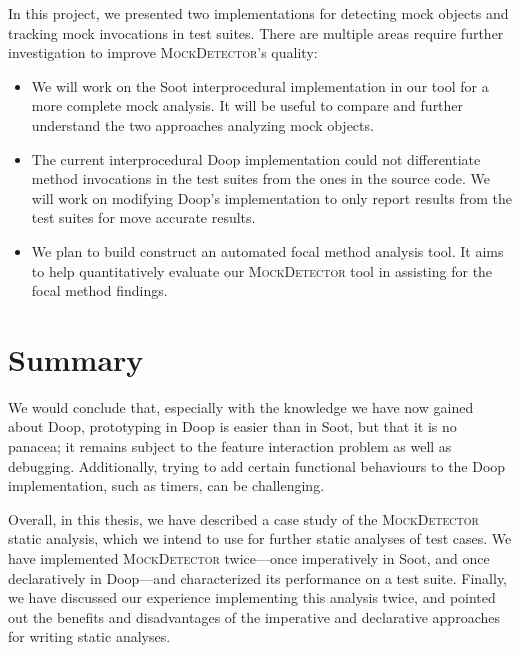 In this project, we presented two implementations for detecting mock objects and tracking mock invocations in test suites. There are multiple areas require further investigation to improve \textsc{MockDetector}'s quality:

\begin{itemize}
	\item We will work on the Soot interprocedural implementation in our tool for a more complete mock analysis. It will be useful to compare and further understand the two approaches analyzing mock objects.
	\item The current interprocedural Doop implementation could not differentiate method invocations in the test suites from the ones in the source code. We will work on modifying Doop's implementation to only report results from the test suites for move accurate results.
	\item We plan to build construct an automated focal method analysis tool. It aims to help quantitatively evaluate our \textsc{MockDetector} tool in assisting for the focal method findings.
\end{itemize}


\section{Summary} 

We would conclude that, especially with the knowledge we have now gained about Doop, prototyping in Doop is easier than in Soot, but that it is no panacea; it remains subject to the feature interaction problem as well as debugging. Additionally, trying to add certain functional behaviours to the Doop implementation, such as timers, can be challenging.

Overall, in this thesis, we have described a case study of the \textsc{MockDetector} static analysis, which we intend to use for further static analyses of test cases. We have implemented \textsc{MockDetector} twice---once imperatively in Soot, and once declaratively in Doop---and characterized its performance on a test suite. Finally, we have discussed our experience implementing this analysis twice, and pointed out the benefits and disadvantages of the imperative and declarative approaches for writing static analyses.